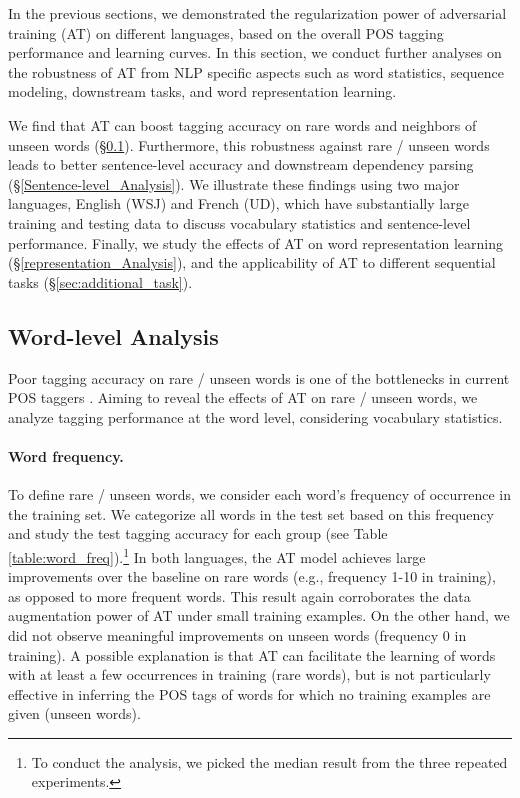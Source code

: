 \documentclass[11pt,a4paper]{article}
\begin{document}
In the previous sections, we demonstrated the regularization power of adversarial training (AT) on different languages, based on the overall POS tagging performance and learning curves.
In this section, we conduct further analyses on the robustness of AT from NLP specific aspects such as word statistics, sequence modeling, downstream tasks, and word representation learning.


We find that AT can boost tagging accuracy on rare words and neighbors of unseen words (\S \ref{Word-level_Analysis}).
Furthermore, this robustness against rare \!/\! unseen words leads to better sentence-level accuracy and downstream dependency parsing (\S \ref{Sentence-level_Analysis}).
We illustrate these findings using
two major languages, English (WSJ) and French (UD), 
which have substantially large training and testing data to discuss vocabulary statistics and sentence-level performance.
Finally, we study the effects of AT on word representation learning (\S \ref{representation_Analysis}), and {the applicability of AT to different sequential tasks} (\S \ref{sec:additional_task}).

\subsection{Word-level Analysis}
\label{Word-level_Analysis}
Poor tagging accuracy on rare \!/\! unseen words is one of the bottlenecks in current POS taggers \cite{Manning:2011:from97to100,plank2016multilingual}.
Aiming to reveal the effects of %
AT on rare \!/\! unseen words, we analyze tagging performance at the word level, considering vocabulary statistics.



\paragraph{Word frequency.} 



To define rare \!/\! unseen words, we consider each word's frequency of occurrence in the training set. 
We categorize all words in the test set based on this frequency and
study the test tagging accuracy for each group (see Table \ref{table:word_freq}).\footnote{
To conduct the analysis, we picked the median result from the three repeated experiments.}
In both languages, the AT model achieves large improvements over the baseline on rare words (e.g., frequency 1-10 in training), as opposed to more frequent words.
This result again corroborates the data augmentation power of AT under small training examples.
On the other hand, we did not observe meaningful improvements
on unseen words (frequency 0 in training). 
A possible explanation is that AT can facilitate the learning of words with at least a few occurrences in training (rare words),
but is not particularly effective in inferring the POS tags of words for which no training examples are given (unseen words).
\end{document}
